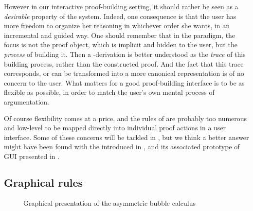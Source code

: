 However in our interactive proof-building setting, it should rather be seen as a
\emph{desirable} property of the system. Indeed, one consequence is that the
user has more freedom to organize her reasoning in whichever order she wants, in
an incremental and guided way. One should remember that in the 
paradigm, the focus is not the proof object, which is implicit and hidden to the
user, but the \emph{process} of building it. Then a -derivation is
better understood as the \emph{trace} of this building process, rather than the
constructed proof. And the fact that this trace corresponds, or
can be transformed into a more canonical representation is of no concern to the
user. What matters for a good proof-building interface is to be as flexible as
possible, in order to match the user's own mental process of argumentation.

Of course flexibility comes at a price, and the rules of  are probably
too numerous and low-level to be mapped directly into individual proof actions
in a user interface. Some of these concerns will be tackled in
, but we think a better answer might have been found
with the  introduced in , and its associated
prototype of GUI presented in .


\subsection{Graphical rules}

\begin{figure*}
  
  \caption{Graphical presentation of the asymmetric bubble calculus }
\end{figure*}


